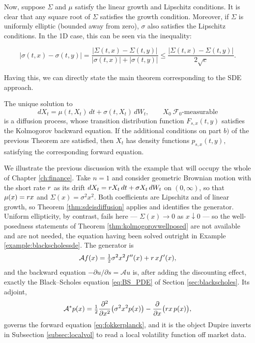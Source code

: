 Now, suppose $\Sigma$ and $\mu$ satisfy the linear growth and Lipschitz conditions. It is clear that any square root of $\Sigma$ satisfies the growth condition. Moreover, if $\Sigma$ is uniformly elliptic (bounded away from zero), $\sigma$ also satisfies the Lipschitz conditions. In the 1D case, this can be seen via the inequality:

\begin{equation}
    |\sigma(t,x)-\sigma(t,y)| = \frac{|\Sigma(t,x)-\Sigma(t,y)|}{|\sigma(t,x)|+|\sigma(t,y)|}\leq \frac{|\Sigma(t,x)-\Sigma(t,y)|}{2\sqrt{c}}.
\end{equation}

Having this, we can directly state the main theorem corresponding to the SDE approach.

\begin{theorem}\label{thm:sdeapproach}
    The unique solution to 
    \begin{equation}
        dX_t = \mu(t,X_t) \, dt + \sigma(t,X_t)\, dW_t, \qquad X_{0} \ \mathcal{F}_{0}\text{-measurable}
    \end{equation}
    is a diffusion process, whose transition distribution function $F_{s,x}(t,y)$ satisfies the Kolmogorov backward equation. If the additional conditions on part $b)$ of the previous Theorem are satisfied, then $X_t$ has density functions $p_{s,x}(t,y)$, satisfying the corresponding forward equation. \qedopentext
\end{theorem}

\begin{example}
We illustrate the previous discussion with the example that will occupy the whole of Chapter \ref{ch:finance}.
Take $n=1$ and consider geometric Brownian motion with the short rate $r$ as its drift
$dX_t = r X_t\,dt + \sigma X_t\,dW_t$ on
$(0,\infty)$, so that $\mu(x) = r x$ and $\Sigma(x) = \sigma^2x^2$. Both coefficients are
Lipschitz and of linear growth, so Theorem \ref{thm:sdeisdiffusion} applies and identifies the
generator. Uniform ellipticity, by contrast, fails here --- $\Sigma(x) \to 0$ as $x \downarrow 0$ ---
so the well-posedness statements of Theorem \ref{thm:kolmogorovwellposed} are not available and are
not needed, the equation having been solved outright in Example \ref{example:blackscholessde}. The
generator is
\begin{equation}
\mathcal{A}f(x) = \tfrac{1}{2}\sigma^2 x^2 f''(x) + r\,x f'(x),
\end{equation}
and the backward equation $-\partial u/\partial s = \mathcal{A}u$ is, after adding the discounting effect, exactly the Black--Scholes equation \eqref{eq:BS_PDE} of
Section \ref{sec:blackscholes}. Its adjoint,
\begin{equation}
\mathcal{A}^*p(x) = \tfrac{1}{2}\frac{\partial^2}{\partial x^2}\bigl(\sigma^2x^2p(x)\bigr)
- \frac{\partial}{\partial x}\bigl(r x\,p(x)\bigr),
\end{equation}
governs the forward equation \eqref{eq:fokkerplanck}, and it is the object Dupire inverts in
Subsection \ref{subsec:localvol} to read a local volatility function off market data.
\end{example}
